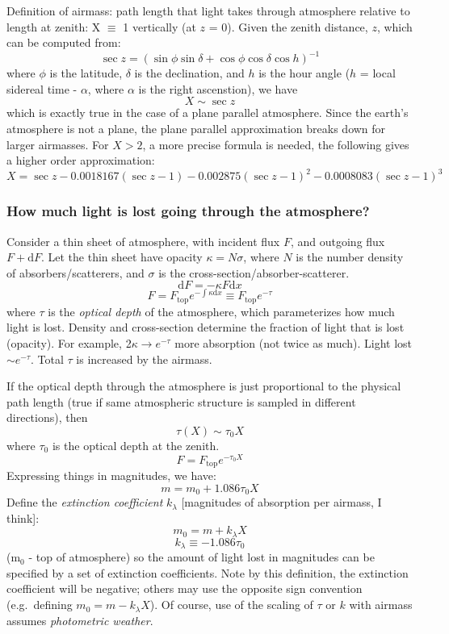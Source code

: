 \documentclass[12pt]{article}
\begin{document}
Definition of airmass: path length that light takes through atmosphere
relative to length at zenith: X $\equiv$ 1 vertically (at $z$ = 0).
Given the zenith distance, $z$, which can be computed from:
    $$ \sec z = \left(\sin\phi\sin\delta +
                 \cos\phi\cos\delta\cos h\right)^{-1} $$
where $\phi$ is the latitude, $\delta$ is the declination, and $h$ is
the hour angle ($h$ = local sidereal time - $\alpha$, where $\alpha$ is
the right ascenstion), we have
    $$ X \sim \sec z $$
which is exactly true in the case of a plane parallel atmosphere. Since
the earth's atmosphere is not a plane, the plane parallel
approximation breaks down for larger airmasses. For $X>2$, a more
precise formula is needed, the following gives a higher order
approximation:
    $$ X = \sec z - 0.0018167(\sec z-1)
                  - 0.002875(\sec z-1)^2
                  - 0.0008083(\sec z-1)^3 $$

\subsubsection*{How much light is lost going through the atmosphere?}
Consider a thin sheet of atmosphere, with incident flux $F$, and
outgoing flux $F + \textrm{d}F$.
Let the thin sheet have opacity $\kappa = N\sigma$,
where $N$ is the number density of absorbers/scatterers, and
$\sigma$ is the cross-section/absorber-scatterer.
    $$ \textrm{d}F = -\kappa F \textrm{d}x $$
    $$ F = F_{\textrm{top}}e^{-\int\kappa\textrm{d}x}
         \equiv F_{\textrm{top}}e^{-\tau} $$
where $\tau$ is the \emph{optical depth} of the atmosphere, which
parameterizes how much light is lost.
\textcolor{myBlue}{Density and cross-section determine the fraction
    of light that is lost (opacity). For example, 2$\kappa \rightarrow
    e^{-\tau}$ more absorption (not twice as much).
    Light lost $\sim e^{-\tau}$.
    Total $\tau$ is increased by the airmass.
}

If the optical depth through the atmosphere is just proportional to
the physical path length (true if same atmospheric structure is
sampled in different directions), then
    $$ \tau(X) \sim \tau_0X $$
where $\tau_0$ is the optical depth at the zenith.
    $$ F = F_{\textrm{top}}e^{-\tau_0X} $$
Expressing things in magnitudes, we have:
    $$ m = m_0 + 1.086\tau_0X $$
Define the \emph{extinction coefficient} $k_{\lambda}$ [magnitudes of
absorption per airmass, I think]:
    $$ m_0 = m + k_{\lambda}X $$
    $$ k_{\lambda} \equiv -1.086\tau_0 $$
(m$_0$ - top of atmosphere)
so the amount of light lost in magnitudes can be specified by a set of
extinction coefficients. Note by this definition, the extinction
coefficient will be negative; others may use the opposite sign
convention (e.g.\ defining $m_0 = m - k_{\lambda}X$). Of
course, use of the scaling of $\tau$ or $k$ with airmass assumes
\emph{photometric weather}.
\end{document}
